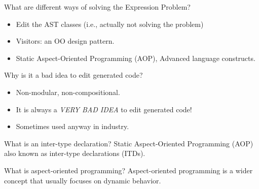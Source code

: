 \documentclass[11pt]{beamer}
\begin{document}
\begin{frame}
\begin{block}{What are different ways of solving the Expression Problem?}
\begin{itemize}
\item Edit the AST classes (i.e., actually not solving the problem)
\item Visitors: an OO design pattern.
\item Static Aspect-Oriented Programming (AOP), Advanced language constructs.
\end{itemize}
\end{block}

\begin{block}{Why is it a bad idea to edit generated code?}
\begin{itemize}
\item Non-modular, non-compositional.
\item It is always a \textit{VERY BAD IDEA} to edit generated code!
\item Sometimes used anyway in industry.
\end{itemize}
\end{block}
\end{frame}

\begin{frame}
\begin{block}{What is an inter-type declaration? }
Static Aspect-Oriented Programming (AOP) also known as inter-type declarations (ITDs).
\end{block}

\begin{block}{What is aspect-oriented programming?}
Aspect-oriented programming is a wider concept that usually focuses on dynamic behavior.
\end{block}


\end{frame}
\end{document}
